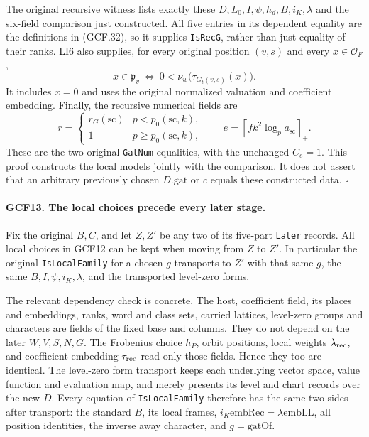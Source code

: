 \documentclass[11pt,a4paper]{article}
\numberwithin{equation}{section}
\theoremstyle{remark}\newtheorem{remark}[theorem]{Remark}
\begin{document}
The original recursive witness lists exactly these \(D,L_0,I,\psi,
h_d,B,i_K,\lambda\) and the six-field comparison just constructed.
All five entries in its dependent equality are the definitions in
(GCF.32), so it supplies \texttt{Is\allowbreak Rec\allowbreak G}, rather than just equality
of their ranks.  LI6 also supplies, for every original position
\((v,s)\) and every \(x\in\mathcal O_F\),
\[
 x\in\mathfrak p_v
 \ \Longleftrightarrow\
  0<\nu_w\bigl(\tau_{G_t(v,s)}(x)\bigr).             \tag{GCF.35}
\]
It includes \(x=0\) and uses the original normalized valuation and
coefficient embedding.  Finally, the recursive numerical fields are
\[
 r=\begin{cases}r_G(\mathrm{sc})&p<p_0(\mathrm{sc},k),\\1&
                                  p\ge p_0(\mathrm{sc},k),
       \end{cases}\qquad
 e=\left\lceil f k^2\log_p a_{\mathrm{sc}}\right\rceil_+.
 \tag{GCF.36}
\]
These are the two original \texttt{Gat\allowbreak Num} equalities, with the
unchanged \(C_e=1\).  This proof constructs the local models jointly
with the comparison.  It does not assert that an arbitrary previously
chosen \(D.\mathrm{gat}\) or \(c\) equals these constructed data.
\hfill\(\square\)

\paragraph{GCF13. The local choices precede every later stage.}
\label{claim:GCF13}
Fix the original \(B,C\), and let \(Z,Z'\) be any two of its
five-part \texttt{Later} records.  All local choices in GCF12 can be
kept when moving from \(Z\) to \(Z'\).  In particular the original
\texttt{Is\allowbreak Local\allowbreak Family} for a chosen \(g\) transports to \(Z'\)
with that same \(g\), the same \(B,I,\psi,i_K,\lambda\), and
the transported level-zero forms.

The relevant dependency check is concrete.  The host, coefficient
field, its places and embeddings, ranks, word and class sets, carried
lattices, level-zero groups and characters are fields of the fixed
base and columns.  They do not depend on the later
\(W,V,S,N,G\).  The Frobenius choice \(h_P\), orbit positions,
local weights \(\lambda_{\rm rec}\), and coefficient embedding
\(\tau_{\rm rec}\) read only those fields.  Hence they too are
identical.  The level-zero form transport keeps each underlying
vector space, value function and evaluation map, and merely presents
its level and chart records over the new \(D\).
Every equation of \texttt{Is\allowbreak Local\allowbreak Family} therefore has the same two
sides after transport: the standard \(B\), its local frames,
\(i_K\mathrm{embRec}=\lambda\mathrm{embLL}\), all position
identities, the inverse away character, and \(g=\mathrm{gatOf}\).
\end{document}
